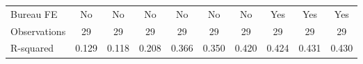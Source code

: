 {\begin{tabular}{l*{9}{c}}
Bureau FE   &          No         &          No         &          No         &          No         &          No         &          No         &         Yes         &         Yes         &         Yes         \\
Observations&          29         &          29         &          29         &          29         &          29         &          29         &          29         &          29         &          29         \\
R-squared   &       0.129         &       0.118         &       0.208         &       0.366         &       0.350         &       0.420         &       0.424         &       0.431         &       0.430         \\
\bottomrule
\end{tabular}
}
